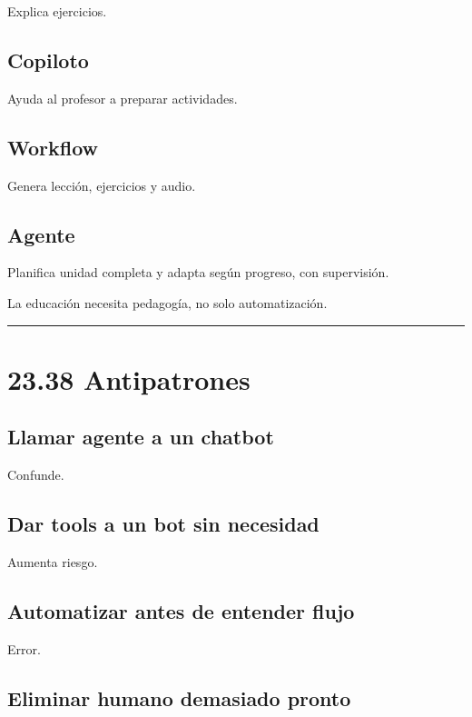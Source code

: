 Explica ejercicios.

\subsection{Copiloto}\label{copiloto-7}

Ayuda al profesor a preparar actividades.

\subsection{Workflow}\label{workflow-7}

Genera lección, ejercicios y audio.

\subsection{Agente}\label{agente-8}

Planifica unidad completa y adapta según progreso, con supervisión.

La educación necesita pedagogía, no solo automatización.

\begin{center}\rule{0.5\linewidth}{0.5pt}\end{center}

\section{23.38 Antipatrones}\label{antipatrones-12}

\subsection{Llamar agente a un
chatbot}\label{llamar-agente-a-un-chatbot}

Confunde.

\subsection{Dar tools a un bot sin
necesidad}\label{dar-tools-a-un-bot-sin-necesidad}

Aumenta riesgo.

\subsection{Automatizar antes de entender
flujo}\label{automatizar-antes-de-entender-flujo}

Error.

\subsection{Eliminar humano demasiado
pronto}\label{eliminar-humano-demasiado-pronto}

